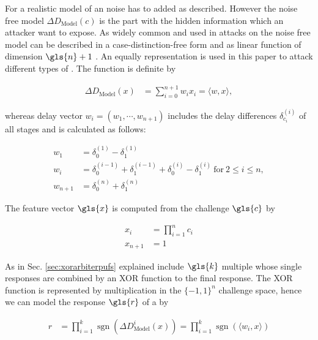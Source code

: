 For a realistic model of an \apuf noise has to added as described. 
However the noise free model $\Delta D_{\mathrm{Model}}(c)$ is the part with the hidden information which an attacker want to expose.
As widely common and used in attacks on \apuf the noise free model can be described in a case-distinction-free form and as linear function of dimension $\gls{n} + 1$ \cite{Majzoobi2008TestingSecurity, Majzoobi2008LightweightPUFs, Ruhrmair2010ModelingFunctions, Becker2015ThePUFs}.
An equally representation is used in this paper to attack different types of \apufs.
The function is definite by

\begin{align*}
\Delta D_{\mathrm{Model}}(x) &= \sum_{i=0}^{n+1} w_i x_i = \langle w,x\rangle,
\end{align*}

whereas delay vector $w_i = (w_1, \cdots, w_{n+1})$ includes the delay differences $\delta_{c_i}^{(i)}$ of all stages and is calculated as follows:

\begin{align*}
w_1 &= \delta_{0}^{(1)} - \delta_{1}^{(1)}\\
w_i &= \delta_{0}^{(i-1)} + \delta_{1}^{(i-1)} + \delta_{0}^{(i)} - \delta_{1}^{(i)}\ \text{for}\ 2 \le i \le n,\\
w_{n+1} &= \delta_{0}^{(n)} + \delta_{1}^{(n)}
\end{align*}
 
The feature vector $\gls{x}$ is computed from the challenge $\gls{c}$ by

\begin{align*}
x_i &= \prod_{i=1}^n c_i\\
x_{n+1} &= 1
\end{align*}

As in Sec. \ref{sec:xorarbiterpufs} explained \xpufs include $\gls{k}$ multiple \apufs whose single responses are combined by an \ac{XOR} function to the final response.
The \ac{XOR} function is represented by multiplication in the $\{-1,1\}^n$ challenge space, hence we can model the response $\gls{r}$ of a \xpuf by

\begin{align*}
r &= \prod_{i=1}^k \operatorname{sgn}(\Delta D_{\mathrm{Model}}^i(x)) = \prod_{i=1}^k \operatorname{sgn}(\langle w_i,x\rangle)
\end{align*}

